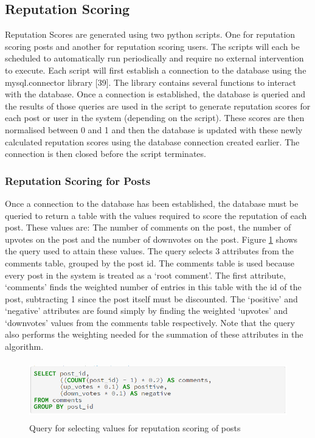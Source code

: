 \subsection{Reputation Scoring}
Reputation Scores are generated using two python scripts. One for reputation scoring posts and another for reputation scoring users. The scripts will each be scheduled to automatically run periodically and require no external intervention to execute. Each script will first establish a connection to the database using the mysql.connector library [39]. The library contains several functions to interact with the database. Once a connection is established, the database is queried and the results of those queries are used in the script to generate reputation scores for each post or user in the system (depending on the script). These scores are then normalised between 0 and 1 and then the database is updated with these newly calculated reputation scores using the database connection created earlier. The connection is then closed before the script terminates.

\subsubsection{Reputation Scoring for Posts}
Once a connection to the database has been established, the database must be queried to return a table with the values required to score the reputation of each post. These values are: The number of comments on the post, the number of upvotes on the post and the number of downvotes on the post. Figure \ref{fig:PostRepQuery} shows the query used to attain these values. The query selects 3 attributes from the comments table, grouped by the post id. The comments table is used because every post in the system is treated as a `root comment'. The first attribute, `comments' finds the weighted number of entries in this table with the id of the post, subtracting 1 since the post itself must be discounted. The `positive' and `negative' attributes are found simply by finding the weighted `upvotes' and `downvotes' values from the comments table respectively. Note that the query also performs the weighting needed for the summation of these attributes in the algorithm.

\begin{figure}[H]
\centering
\includegraphics[height=1in]{Images/Implementation/PostRepQuery}
\caption{Query for selecting values for reputation scoring of posts}
\label{fig:PostRepQuery}
\end{figure}

